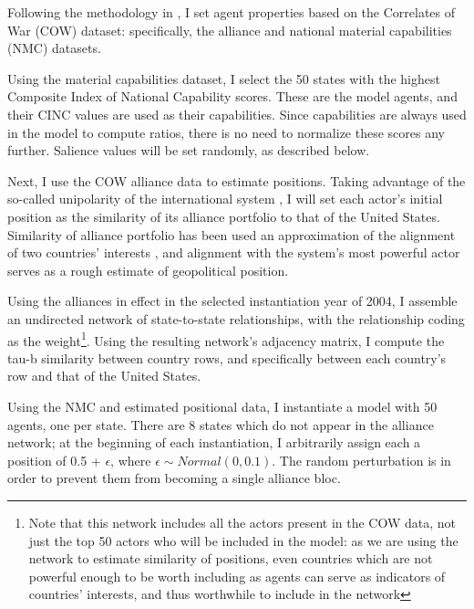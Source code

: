 Following the methodology in \citet{bdm_1998}, I set agent properties based on the Correlates of War (COW) dataset: specifically, the alliance \citep{gibler_2004} and national material capabilities (NMC) \citep{singer_1988,grieg_2010} datasets. 

Using the material capabilities dataset, I select the 50 states with the highest Composite Index of National Capability scores. These are the model agents, and their CINC values are used as their capabilities. Since capabilities are always used in the model to compute ratios, there is no need to normalize these scores any further. Salience values will be set randomly, as described below.

Next, I use the COW alliance data to estimate positions. Taking advantage of the so-called unipolarity of the international system \citep{wohlforth_1999}, I will set each actor's initial position as the similarity of its alliance portfolio to that of the United States. Similarity of alliance portfolio has been used an approximation of the alignment of two countries' interests \citep{bdm_1975}, and alignment with the system's most powerful actor serves as a rough estimate of geopolitical position. 

Using  the alliances in effect in the selected instantiation year of 2004, I assemble an undirected network of state-to-state relationships, with the relationship coding as the weight\footnote{Note that this network includes all the actors present in the COW data, not just the top 50 actors who will be included in the model: as we are using the network to estimate similarity of positions, even countries which are not powerful enough to be worth including as agents can serve as indicators of countries' interests, and thus worthwhile to include in the network}. Using the resulting network's adjacency matrix, I compute the tau-b similarity \citep{bdm_1975} between country rows, and specifically between each country's row and that of the United States.

%
%

Using the NMC and estimated positional data, I instantiate a model with 50 agents, one per state. There are 8 states which do not appear in the alliance network; at the beginning of each instantiation, I arbitrarily assign each a position of 0.5 + $\epsilon$, where $\epsilon \sim Normal(0, 0.1)$. The random perturbation is in order to prevent them from becoming a single alliance bloc. 

